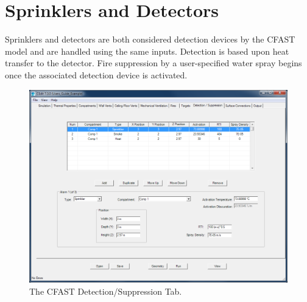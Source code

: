 \section{Sprinklers and Detectors}
\label{info:DEVC2}
Sprinklers and detectors are both considered detection devices by the CFAST model and are handled using the same inputs.  Detection is based upon heat transfer to the detector. Fire suppression by a user-specified water spray begins once the associated detection device is activated.

\begin{figure}[h!]
\begin{center}
\includegraphics[width=6.5in]{FIGURES/Detector_Tab}
\caption[The CFAST Detection/Suppression Tab]{The CFAST Detection/Suppression Tab.}
\end{center}
\end{figure}

